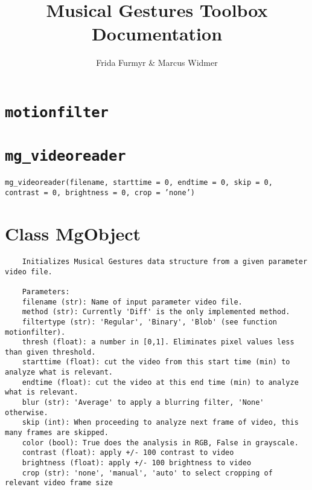 \documentclass[9pt]{extarticle}
\title{Musical Gestures Toolbox\\ \large{Documentation}}
\author{Frida Furmyr \& Marcus Widmer}
\begin{document}
\maketitle
\section*{\texttt{motionfilter}}
\section*{\texttt{mg\_videoreader}}
\hspace{20pt}\texttt{mg\_videoreader(filename, starttime = 0, endtime = 0, skip = 0, contrast = 0, brightness = 0, crop = 'none')}

\section*{Class MgObject}
    \begin{verbatim}
    Initializes Musical Gestures data structure from a given parameter video file.

    Parameters:
    filename (str): Name of input parameter video file.
    method (str): Currently 'Diff' is the only implemented method. 
    filtertype (str): 'Regular', 'Binary', 'Blob' (see function motionfilter).
    thresh (float): a number in [0,1]. Eliminates pixel values less than given threshold.
    starttime (float): cut the video from this start time (min) to analyze what is relevant.
    endtime (float): cut the video at this end time (min) to analyze what is relevant.
    blur (str): 'Average' to apply a blurring filter, 'None' otherwise.
    skip (int): When proceeding to analyze next frame of video, this many frames are skipped.
    color (bool): True does the analysis in RGB, False in grayscale. 
    contrast (float): apply +/- 100 contrast to video
    brightness (float): apply +/- 100 brightness to video
    crop (str): 'none', 'manual', 'auto' to select cropping of relevant video frame size
    \end{verbatim}
    
\end{document}
